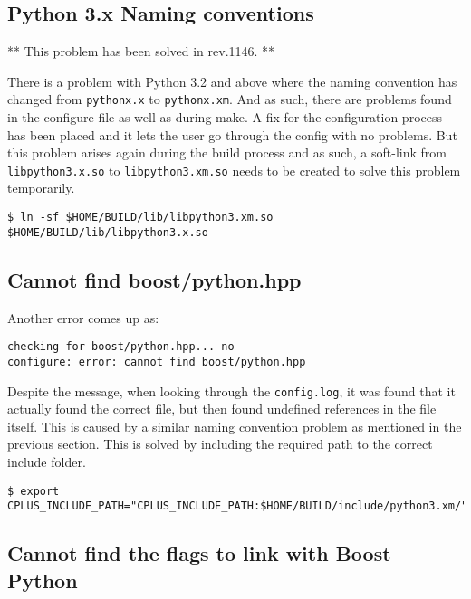 \subsection{Python 3.x Naming conventions} %
\label{subsec:python3_naming_conventions}

** This problem has been solved in rev.1146. **

There is a problem with Python 3.2 and above where the naming convention has changed from \lstinline{pythonx.x} to \lstinline{pythonx.xm}. And as such, there are problems found in the configure file as well as during make. A fix for the configuration process has been placed and it lets the user go through the config with no problems. But this problem arises again during the build process and as such, a soft-link from \lstinline{libpython3.x.so} to \lstinline{libpython3.xm.so} needs to be created to solve this problem temporarily.

\begin{lstlisting}[style=inlineBash]
$ ln -sf $HOME/BUILD/lib/libpython3.xm.so $HOME/BUILD/lib/libpython3.x.so
\end{lstlisting}

\subsection{Cannot find boost/python.hpp} %

Another error comes up as:
\begin{lstlisting}[style=inlineBash]
checking for boost/python.hpp... no
configure: error: cannot find boost/python.hpp
\end{lstlisting}

Despite the message, when looking through the \lstinline{config.log}, it was found that it actually found the correct file, but then found undefined references in the file itself. This is caused by a similar naming convention problem as mentioned in the previous section. This is solved by including the required path to the correct include folder.
\begin{lstlisting}[style=inlineBash]
$ export CPLUS_INCLUDE_PATH="CPLUS_INCLUDE_PATH:$HOME/BUILD/include/python3.xm/"
\end{lstlisting}

\subsection{Cannot find the flags to link with Boost Python} %

